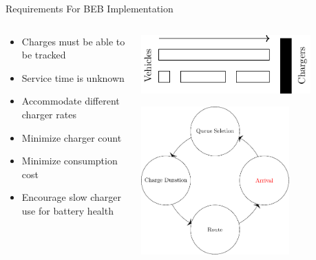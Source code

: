 \documentclass[aspectratio=169,dvipsnames]{beamer}
\begin{document}
\begin{frame}[label={sec:orge85bc16}]{Requirements For BEB Implementation}
\begin{columns}
\begin{column}{0.5\columnwidth}
\begin{itemize}
\item Charges must be able to be tracked
\item Service time is unknown
\item Accommodate different charger rates
\item Minimize charger count
\item Minimize consumption cost
\item Encourage slow charger use for battery health
\end{itemize}
\end{column}

\begin{column}{0.5\columnwidth}
\begin{center}
\includegraphics[width=0.8\textwidth]{./img/pap.pdf}
\end{center}

\begin{center}
\includegraphics[width=0.7\textwidth]{./img/visit.pdf}
\end{center}
\end{column}
\end{columns}
\end{frame}
\end{document}
